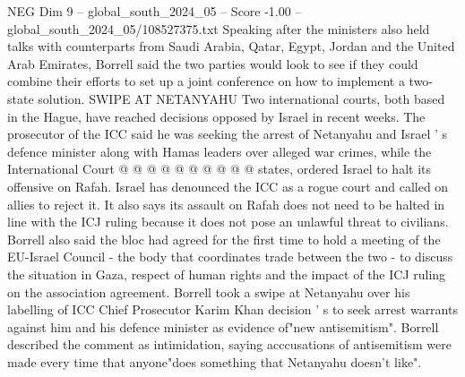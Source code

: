 \begin{textsample}{NEG Dim 9 – global\_south\_2024\_05 – Score -1.00 – global\_south\_2024\_05/108527375.txt}
Speaking after the ministers also held talks with counterparts from Saudi Arabia, Qatar, Egypt, Jordan and the United Arab Emirates, Borrell said the two parties would look to see if they could combine their efforts to set up a joint conference on how to implement a two-state solution.
SWIPE AT NETANYAHU Two international courts, both based in the Hague, have reached decisions opposed by Israel in recent weeks.
The prosecutor of the ICC said he was seeking the arrest of Netanyahu and Israel ' s defence minister along with Hamas leaders over alleged war crimes, while the International Court @ @ @ @ @ @ @ @ @ @ states, ordered Israel to halt its offensive on Rafah.
Israel has denounced the ICC as a rogue court and called on allies to reject it.
It also says its assault on Rafah does not need to be halted in line with the ICJ ruling because it does not pose an unlawful threat to civilians.
Borrell also said the bloc had agreed for the first time to hold a meeting of the EU-Israel Council - the body that coordinates trade between the two - to discuss the situation in Gaza, respect of human rights and the impact of the ICJ ruling on the association agreement.
Borrell took a swipe at Netanyahu over his labelling of ICC Chief Prosecutor Karim Khan decision ' s to seek arrest warrants against him and his defence minister as evidence of"new antisemitism".
Borrell described the comment as intimidation, saying acccusations of antisemitism were made every time that anyone"does something that Netanyahu doesn't like".

\end{textsample}
